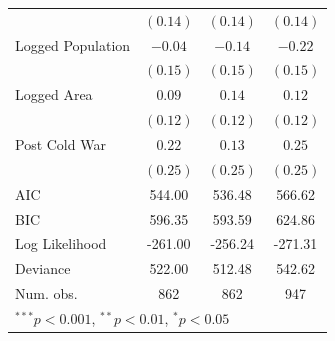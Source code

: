 \documentclass[12pt,]{book}
\let\origtable\table
\let\endorigtable\endtable
\renewenvironment{table}[1][2] {
    \singlespacing
    \expandafter\origtable\expandafter[H]
} {
    \endorigtable
}
\theoremstyle{definition}
\theoremstyle{definition}
\theoremstyle{definition}
\theoremstyle{remark}
\begin{document}
\begin{table}
\begin{center}
\begin{tabular}{l c c c }
                                        & $(0.14)$     & $(0.14)$      & $(0.14)$      \\
Logged Population                       & $-0.04$      & $-0.14$       & $-0.22$       \\
                                        & $(0.15)$     & $(0.15)$      & $(0.15)$      \\
Logged Area                             & $0.09$       & $0.14$        & $0.12$        \\
                                        & $(0.12)$     & $(0.12)$      & $(0.12)$      \\
Post Cold War                           & $0.22$       & $0.13$        & $0.25$        \\
                                        & $(0.25)$     & $(0.25)$      & $(0.25)$      \\
\hline
AIC                                     & 544.00       & 536.48        & 566.62        \\
BIC                                     & 596.35       & 593.59        & 624.86        \\
Log Likelihood                          & -261.00      & -256.24       & -271.31       \\
Deviance                                & 522.00       & 512.48        & 542.62        \\
Num. obs.                               & 862          & 862           & 947           \\
\hline
\multicolumn{4}{l}{\scriptsize{$^{***}p<0.001$, $^{**}p<0.01$, $^*p<0.05$}}
\end{tabular}
\caption{Logit Models of Multi-Rebel Conflict-Years (< 1000 Fatalities Only)}
\label{tab:combined-conflict}
\end{center}
\end{table}
\end{document}
